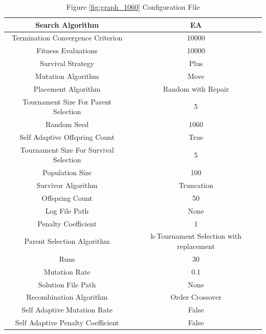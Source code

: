 \documentclass{standalone}
\begin{document}
\begin{table}[!htb]
	\centering
	\caption{Figure \ref{fig:graph_1060} Configuration File}
	\label{tab:graph_1060}
	\begin{tabular}{| c | c |}
		\hline
		Search Algorithm		& EA		 \\
		\hline
		Termination Convergence Criterion		& 10000		 \\
		\hline
		Fitness Evaluations		& 10000		 \\
		\hline
		Survival Strategy		& Plus		 \\
		\hline
		Mutation Algorithm		& Move		 \\
		\hline
		Placement Algorithm		& Random with Repair		 \\
		\hline
		Tournament Size For Parent Selection		& 5		 \\
		\hline
		Random Seed		& 1060		 \\
		\hline
		Self Adaptive Offspring Count		& True		 \\
		\hline
		Tournament Size For Survival Selection		& 5		 \\
		\hline
		Population Size		& 100		 \\
		\hline
		Survivor Algorithm		& Truncation		 \\
		\hline
		Offspring Count		& 50		 \\
		\hline
		Log File Path		& None		 \\
		\hline
		Penalty Coefficient		& 1		 \\
		\hline
		Parent Selection Algorithm		& k-Tournament Selection with replacement		 \\
		\hline
		Runs		& 30		 \\
		\hline
		Mutation Rate		& 0.1		 \\
		\hline
		Solution File Path		& None		 \\
		\hline
		Recombination Algorithm		& Order Crossover		 \\
		\hline
		Self Adaptive Mutation Rate		& False		 \\
		\hline
		Self Adaptive Penalty Coefficient		& False		 \\
		\hline
	\end{tabular}
\end{table}
\end{document}

